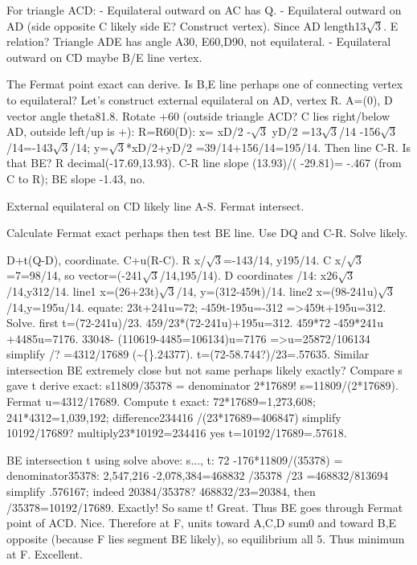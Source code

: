 \begin{decodedreasoningpanel}
For triangle ACD:
- Equilateral outward on AC has Q.
- Equilateral outward on AD (side opposite C likely side E? Construct vertex). Since AD length13\ensuremath{\sqrt{3}}. E relation? Triangle ADE has angle A30, E60,D90, not equilateral.
- Equilateral outward on CD maybe B/E line vertex.

The Fermat point exact can derive. Is B,E line perhaps one of connecting vertex to equilateral? Let's construct external equilateral on AD, vertex R. A=(0), D vector angle theta81.8. Rotate +60 (outside triangle ACD? C lies right/below AD, outside left/up is +): R=R60(D): x= xD/2 -\ensuremath{\sqrt{3}} yD/2 =13\ensuremath{\sqrt{3}}/14 -156\ensuremath{\sqrt{3}}/14=-143\ensuremath{\sqrt{3}}/14; y=\ensuremath{\sqrt{3}}*xD/2+yD/2 =39/14+156/14=195/14. Then line C-R. Is that BE? R decimal(-17.69,13.93). C-R line slope (13.93)/( -29.81)= -.467 (from C to R); BE slope -1.43, no.

External equilateral on CD likely line A-S. Fermat intersect.

Calculate Fermat exact perhaps then test BE line. Use DQ and C-R. Solve likely.

D+t(Q-D), coordinate.
C+u(R-C).
R x/\ensuremath{\sqrt{3}}=-143/14, y195/14. C x/\ensuremath{\sqrt{3}}=7=98/14, so vector=(-241\ensuremath{\sqrt{3}}/14,195/14).
D coordinates /14: x26\ensuremath{\sqrt{3}}/14,y312/14.
line1 x=(26+23t)\ensuremath{\sqrt{3}}/14, y=(312-459t)/14.
line2 x=(98-241u)\ensuremath{\sqrt{3}}/14,y=195u/14.
equate: 23t+241u=72; -459t-195u=-312 =\textgreater{}459t+195u=312.
Solve. first t=(72-241u)/23. 459/23*(72-241u)+195u=312.
459*72 -459*241u +4485u=7176.
33048-
  (110619-4485=106134)u=7176 =\textgreater{}u=25872/106134 simplify /? =4312/17689 (\textasciitilde\{\}.24377). t=(72-58.744?)/23=.57635. Similar intersection BE extremely close but not same perhaps likely exactly? Compare s gave t derive exact: s11809/35378 = denominator 2*17689! s=11809/(2*17689). Fermat u=4312/17689. Compute t exact:
72*17689=1,273,608; 241*4312=1,039,192; difference234416 /(23*17689=406847) simplify 10192/17689? multiply23*10192=234416 yes t=10192/17689=.57618.

BE intersection t using solve above: s..., t:
72 -176*11809/(35378) = denominator35378: 2,547,216 -2,078,384=468832 /35378 /23 =468832/813694 simplify .576167; indeed 20384/35378? 468832/23=20384, then /35378=10192/17689. Exactly! So same t! Great. Thus BE goes through Fermat point of ACD. Nice. Therefore at F, units toward A,C,D sum0 and toward B,E opposite (because F lies segment BE likely), so equilibrium all 5. Thus minimum at F. Excellent.


\end{decodedreasoningpanel}

